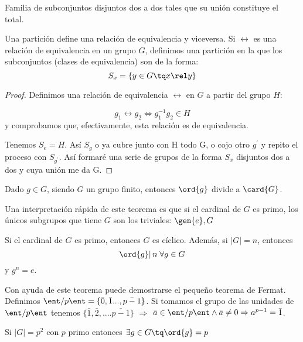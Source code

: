\documentclass[nochap]{apuntes}
\begin{document}
  \begin{defn}[Partición]
   Familia de subconjuntos disjuntos dos a dos tales que su unión constituye el total.
  \end{defn}

  Una partición define una relación de equivalencia y viceversa. Si $\rel$ es una relación de equivalencia en un grupo $G$,
  definimos una partición en la que los subconjuntos (clases de equivalencia) son de la forma: \[ S_{x}=\{y\in G \tq x\rel y\} \]

  \begin{proof} Definimos una relación de equivalencia $\rel$ en $G$ a partir del grupo $H$:

   \[ g_{1}\rel g_{2} \Leftrightarrow g_{1}^{-1}g_{2}\in H \]  y comprobamos que, efectivamente, esta relación es de equivalencia.

   Tenemos $S_{e}=H$. Así $S_{g}$  o ya cubre junto con H todo G, o cojo otro $g^{'}$  y repito el proceso con $S_{g^{'}}$.
   Así formaré una serie de grupos de la forma $S_{x}$  disjuntos dos a dos y cuya unión me da G.
  \end{proof}

  \begin{theorem}
   Dado $g \in  G$, siendo $G$ un grupo finito, entonces $\ord{g}$ divide a $\card{G}$.
  \end{theorem}

  Una interpretación rápida de este teorema es que si el cardinal de $G$ es primo, los únicos subgrupos que tiene $G$ son los triviales: $\gen{e}, G$

  \begin{theorem}
   Si el cardinal de $G$ es primo, entonces $G$ es cíclico. Además, si $|G|=n$, entonces \[ \ord{g} | \, n \; \forall g\in G\] y $g^n = e$.
  \end{theorem}

  \begin{example}
   Con ayuda de este teorema puede demostrarse el pequeño teorema de Fermat.
   Definimos $\ent/p\ent=\{\bar{0},\bar{1}...,\bar{p-1}\}$.
   Si tomamos el grupo de las unidades de $\ent/p\ent$ tenemos $\{\bar{1}, \bar{2},....\bar{p-1}\}$ $\Rightarrow$
   $\bar{a}\in\ent/p\ent \wedge \bar{a}\neq 0 \Rightarrow a^{p-1}=\bar{1}$.
  \end{example}

  \begin{theorem}
   Si $|G|=p^{2}$  con $p$ primo entonces $\exists g \in G \tq \ord{g}=p$
  \end{theorem}
\end{document}
